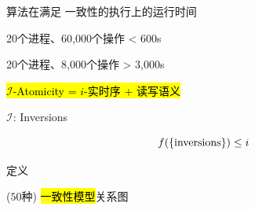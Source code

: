 \begin{frame}{}
  {\readcentric{} 算法在满足 \PRAM{} 一致性的执行上的运行时间}

  \vspace{-0.30cm}

  \begin{description}
    \centering
    \item[\readcentric{}:] 20个进程、60,000个操作 < 600s~\footnotemark[1]~
    \item[\rwclosure{}:] 20个进程、8,000个操作 > 3,000s
  \end{description}
\end{frame}

\begin{frame}{}
  \begin{center}
    \hl{\large $\mathcal{I}$-Atomicity = $i$-实时序 + 读写语义}
  \end{center}

  \vspace{0.60cm}
  \centerline{$\mathcal{I}$: Inversions}

  \pause
  \vspace{0.30cm}
  \[
    f(\{\text{inversions}\}) \le i
  \]

  \pause
  \vspace{0.50cm}
  \centerline{\large 定义}
\end{frame}

\begin{frame}{}
  \begin{center}
    ($50$种) \hl{一致性模型}关系图  
  \end{center}


  \centerline{}
\end{frame}
